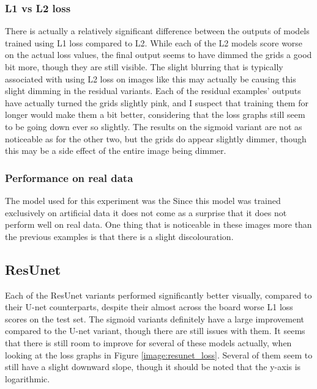 \subsubsection{L1 vs L2 loss}
There is actually a relatively significant difference between the outputs of models trained using L1 loss compared to L2. While each of the L2 models score worse on the actual loss values, the final output seems to have dimmed the grids a good bit more, though they are still visible. The slight blurring that is typically associated with using L2 loss on images like this may actually be causing this slight dimming in the residual variants. Each of the residual examples' outputs have actually turned the grids slightly pink, and I suspect that training them for longer would make them a bit better, considering that the loss graphs still seem to be going down ever so slightly. The results on the sigmoid variant are not as noticeable as for the other two, but the grids do appear slightly dimmer, though this may be a side effect of the entire image being dimmer.

\subsubsection{Performance on real data}
The model used for this experiment was the Since this model was trained exclusively on artificial data it does not come as a surprise that it does not perform well on real data. One thing that is noticeable in these images more than the previous examples is that there is a slight discolouration.

\subsection{ResUnet}
Each of the ResUnet variants performed significantly better visually, compared to their U-net counterparts, despite their almost across the board worse L1 loss scores on the test set. The sigmoid variants definitely have a large improvement compared to the U-net variant, though there are still issues with them. It seems that there is still room to improve for several of these models actually, when looking at the loss graphs in Figure \ref{image:resunet_loss}. Several of them seem to still have a slight downward slope, though it should be noted that the y-axis is logarithmic.


